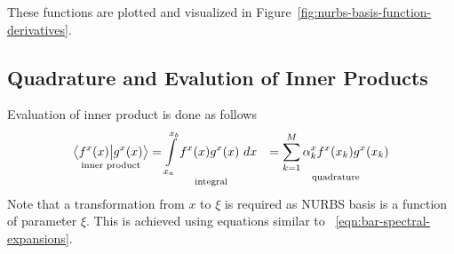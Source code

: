 \documentclass[submit,12pt]{aiaa-pretty} %
\begin{document}
These functions are plotted and visualized in Figure~\ref{fig:nurbs-basis-function-derivatives}.

\subsection{Quadrature and Evalution of Inner Products}
Evaluation of inner product is done as follows
\begin{equation}\nonumber
  \begin{aligned}
    \underset{\text{inner~product}}{\left\langle {\color{black}{f^x(x)}} \big\vert  {\color{black}{g^x(x)}} \right\rangle} &= \underset{\text{integral}}{\int\limits_{x_a}^{x_b}  {\color{black}{f^x(x)}}  {\color{black}{g^x(x)}}~dx} &= \underset{\text{quadrature}}{\sum_{k=1}^M \alpha_k^x  {\color{black}{f^x(x_k)}}  {\color{black}{g^x(x_k)}}}\\
  \end{aligned}
\end{equation}  
Note that a transformation from $x$ to $\xi$ is required as NURBS
basis is a function of parameter $\xi$. This is achieved using
equations similar to ~\ref{eqn:bar-spectral-expansions}.
\end{document}
